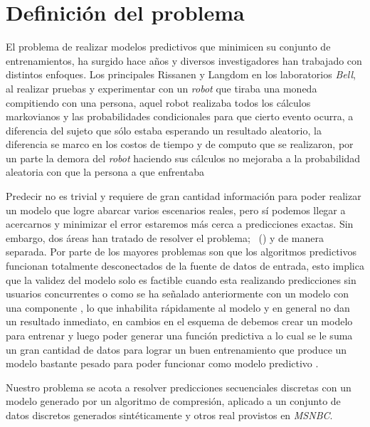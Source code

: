 
\section{Definición del problema}



El problema de realizar modelos predictivos que minimicen su conjunto de entrenamientos, ha surgido hace años y diversos investigadores han trabajado con distintos enfoques. Los principales Rissanen\cite{Rissanen1983} y Langdom\cite{Langdon1983} en los laboratorios \emph{Bell}, al realizar pruebas y experimentar con un \emph{robot} que tiraba una moneda compitiendo con una persona, aquel robot realizaba todos los cálculos {markovianos} y las probabilidades condicionales para que cierto evento ocurra, a diferencia del sujeto que sólo estaba esperando un resultado aleatorio, la diferencia se marco en los costos de tiempo y de computo que se realizaron, por un parte la demora del \emph{robot} haciendo sus cálculos no mejoraba a la probabilidad aleatoria con que la persona a que enfrentaba 

Predecir no es trivial y requiere de gran cantidad información para poder realizar un modelo que logre abarcar varios escenarios reales, pero sí podemos llegar a acercarnos y minimizar el error  estaremos más cerca a predicciones exactas. Sin embargo, dos áreas han tratado de resolver el problema;  \losslessdatacompression~(\LDC) y \machinelearning de manera separada. Por parte de \LDC los mayores problemas son que los algoritmos predictivos  funcionan totalmente desconectados de la fuente de datos de entrada, esto implica que la validez del modelo solo es factible cuando esta realizando predicciones sin usuarios concurrentes o como se ha señalado anteriormente con un modelo con una componente \offline, lo que inhabilita rápidamente al modelo y en general no dan un resultado inmediato, en cambios en el esquema de \machinelearning debemos crear un modelo para entrenar y luego poder generar una función predictiva a lo cual se le suma un gran cantidad de datos para lograr un buen entrenamiento que produce un modelo bastante pesado para poder funcionar como modelo predictivo \online. 

Nuestro problema se acota a resolver predicciones secuenciales discretas con un modelo generado por un algoritmo de compresión, aplicado a un conjunto de datos discretos generados sintéticamente y otros real provistos en \emph{MSNBC}\cite{Claude2014}. 

